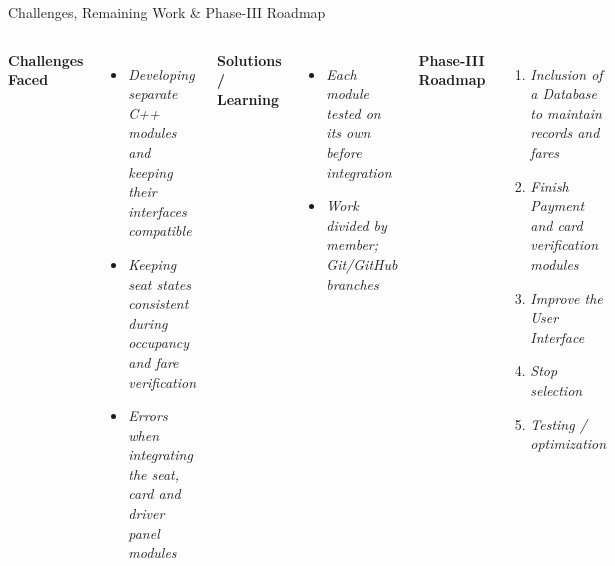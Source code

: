\documentclass[aspectratio=169,11pt]{beamer}
\newcommand{\smallnote}[1]{%
\vspace{0.08cm}
{\scriptsize\color{GEUGrey}#1}
}
\newcommand{\placeholder}[1]{%
\textit{\color{GEUGrey}#1}
}
\begin{document}
\begin{frame}{Challenges, Remaining Work \& Phase-III Roadmap}

\vspace{-7mm}

\begin{columns}[T,totalwidth=\textwidth]


\textbf{\color{GEUBlue}Challenges Faced}

\begin{itemize}\itemsep2pt
\item \placeholder{Developing separate C++ modules and keeping their interfaces compatible}
\item \placeholder{Keeping seat states consistent during occupancy and fare verification}
\item \placeholder{Errors when integrating the seat, card and driver panel modules}
\end{itemize}

\vspace{2mm}

\textbf{\color{GEUBlue}Solutions / Learning}

\begin{itemize}\itemsep2pt
\item \placeholder{Each module tested on its own before integration}
\item \placeholder{Work divided by member; Git/GitHub branches}
\end{itemize}


\textbf{\color{GEUBlue}Phase-III Roadmap}

\begin{enumerate}\itemsep3pt
\item \placeholder{Inclusion of a Database to maintain records and fares}
\item \placeholder{Finish Payment and card verification modules}
\item \placeholder{Improve the User Interface}
\item \placeholder{Stop selection}
\item \placeholder{Testing / optimization}
\end{enumerate}

\end{columns}

\vfill


\end{frame}
\end{document}
